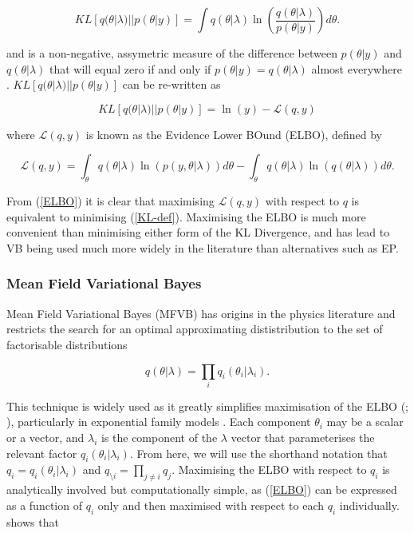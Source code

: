 \documentclass{article}\usepackage[]{graphicx}\usepackage[]{color}
\begin{document}
\begin{equation}
\label{KL-def}
KL[q(\theta | \lambda)||p(\theta | y)] = \int q(\theta | \lambda) \ln \left( \frac{q(\theta | \lambda)}{p(\theta | y)}\right) d\theta.
\end{equation}

and is a non-negative, assymetric measure of the difference between $p(\theta | y)$ and $q(\theta | \lambda)$ that will equal zero if and only if $p(\theta | y) = q(\theta | \lambda)$ almost everywhere \citep{Bishop2006}. $KL[q(\theta | \lambda)||p(\theta | y)]$ can be re-written as

\begin{equation}
\label{KL-ELBO}
KL[q(\theta | \lambda)||p(\theta | y)] = \ln(y) - \mathcal{L}(q, y)
\end{equation}

where $\mathcal{L}(q, y)$ is known as the Evidence Lower BOund (ELBO), defined by

\begin{equation}
\label{ELBO}
\mathcal{L}(q, y) = \int_{\theta} q(\theta|\lambda) \ln (p(y, \theta|\lambda)) d\theta -  \int_{\theta} q(\theta|\lambda) \ln (q(\theta|\lambda)) d\theta.
\end{equation}

From (\ref{ELBO}) it is clear that maximising $\mathcal{L}(q, y)$ with respect to $q$ is equivalent to minimising (\ref{KL-def}). Maximising the ELBO is much more convenient than minimising either form of the KL Divergence, and has lead to VB being used much more widely in the literature than alternatives such as EP.

\subsubsection{Mean Field Variational Bayes} 

Mean Field Variational Bayes (MFVB) has origins in the physics literature \citep{Chandler1987} and restricts the search for an optimal approximating dististribution to the set of factorisable distributions

\begin{equation}
\label{mf1}
q(\theta|\lambda) = \prod_i q_i(\theta_i | \lambda_i).
\end{equation}

This technique is widely used as it greatly simplifies maximisation of the ELBO (\citealp{Jordan1999}; \citealp{Bishop2006}), particularly in exponential family models \citep{Wainwright2008}. Each component $\theta_i$ may be a scalar or a vector, and $\lambda_i$ is the component of the $\lambda$ vector that parameterises the relevant factor $q_i(\theta_i |\lambda_i)$. From here, we will use the shorthand notation that $q_i = q_i(\theta_i|\lambda_i)$ and $q_{\setminus i} = \prod_{j\neq i}q_j$. Maximising the ELBO with respect to $q_i$ is analytically involved but computationally simple, as (\ref{ELBO}) can be expressed as a function of $q_i$ only and then maximised with respect to each $q_i$ individually. \citet{Attias1999} shows that 
\end{document}

